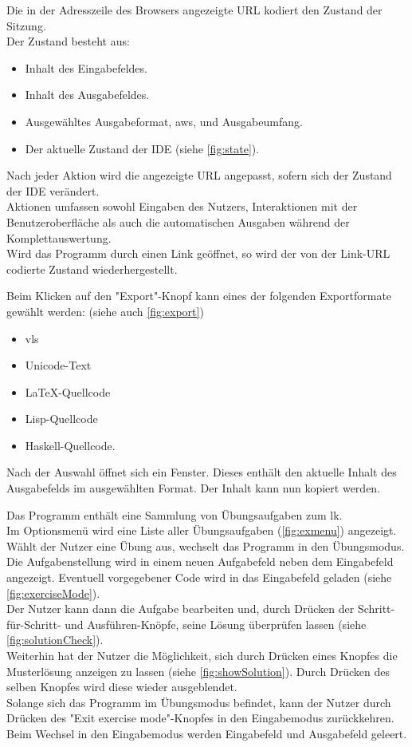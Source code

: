 \documentclass[parskip=full,11pt,twoside]{scrartcl}
\begin{document}
Die in der Adresszeile des Browsers angezeigte URL kodiert den Zustand der Sitzung.\\
Der Zustand besteht aus:
\begin{itemize}
	\item Inhalt des Eingabefeldes.
	\item Inhalt des Ausgabefeldes.
	\item Ausgewähltes Ausgabeformat, \gls{aws}, und Ausgabeumfang.
	\item Der aktuelle Zustand der IDE (siehe \cref{fig:state}).
\end{itemize}
Nach jeder Aktion wird die angezeigte URL angepasst, sofern sich der Zustand der IDE verändert.\\
Aktionen umfassen sowohl Eingaben des Nutzers, Interaktionen mit der Benutzeroberfläche als auch die automatischen Ausgaben während der Komplettauswertung.\\ 
Wird das Programm durch einen Link geöffnet, so wird der von der Link-URL codierte Zustand wiederhergestellt.

Beim Klicken auf den "Export"-Knopf kann eines der folgenden Exportformate gewählt werden: (siehe auch \cref{fig:export})
\begin{itemize}
	\item \gls{vls}
	\item Unicode-Text
	\item \LaTeX-Quellcode
	\item Lisp-Quellcode
	\item Haskell-Quellcode.
\end{itemize}
Nach der Auswahl öffnet sich ein Fenster.
Dieses enthält den aktuelle Inhalt des Ausgabefelds im ausgewählten Format.
Der Inhalt kann nun kopiert werden.

Das Programm enthält eine Sammlung von Übungsaufgaben zum \gls{lk}.\\
Im Optionsmenü wird eine Liste aller Übungsaufgaben (\cref{fig:exmenu}) angezeigt.\\
Wählt der Nutzer eine Übung aus, wechselt das Programm in den Übungsmodus. Die Aufgabenstellung wird in einem neuen Aufgabefeld neben dem Eingabefeld angezeigt. Eventuell vorgegebener Code wird in das Eingabefeld geladen (siehe \cref{fig:exerciseMode}).\\
Der Nutzer kann dann die Aufgabe bearbeiten und, durch Drücken der Schritt-für-Schritt- und Ausführen-Knöpfe, seine Lösung überprüfen lassen (siehe \cref{fig:solutionCheck}).\\
Weiterhin hat der Nutzer die Möglichkeit, sich durch Drücken eines Knopfes die Musterlösung anzeigen zu lassen (siehe \cref{fig:showSolution}). Durch Drücken des selben Knopfes wird diese wieder ausgeblendet. \\
Solange sich das Programm im Übungsmodus befindet, kann der Nutzer durch Drücken des "Exit exercise mode"-Knopfes in den Eingabemodus zurückkehren.\\
Beim Wechsel in den Eingabemodus werden Eingabefeld und Ausgabefeld geleert.
\end{document}
